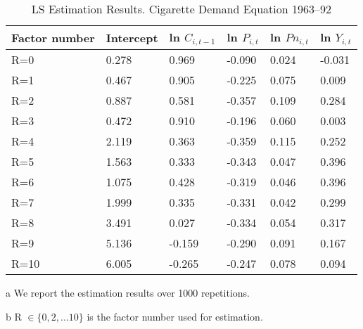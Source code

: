 \documentclass[a4paper]{article}
\begin{document}
\clearpage

\begin{table}[]
\centering
\caption{ LS Estimation Results. Cigarette Demand Equation 1963–92}
\label{table:table10}
\begin{threeparttable}
\begin{tabular}{llllll}
\hline
Factor number & Intercept & ln $C_{i,t-1}$ & ln $P_{i,t}$ & ln $Pn_{i,t}$ & ln $Y_{i,t}$ \\ \hline
R=0           & 0.278     & 0.969          & -0.090       & 0.024         & -0.031       \\
R=1           & 0.467     & 0.905          & -0.225       & 0.075         & 0.009        \\
R=2           & 0.887     & 0.581          & -0.357       & 0.109         & 0.284        \\
R=3           & 0.472     & 0.910          & -0.196       & 0.060         & 0.003        \\
R=4           & 2.119     & 0.363          & -0.359       & 0.115         & 0.252        \\
R=5           & 1.563     & 0.333          & -0.343       & 0.047         & 0.396        \\
R=6           & 1.075     & 0.428          & -0.319       & 0.046         & 0.396        \\
R=7           & 1.999     & 0.335          & -0.331       & 0.042         & 0.299        \\
R=8           & 3.491     & 0.027          & -0.334       & 0.054         & 0.317        \\
R=9           & 5.136     & -0.159         & -0.290       & 0.091         & 0.167        \\
R=10          & 6.005     & -0.265         & -0.247       & 0.078         & 0.094        \\ \hline
\end{tabular}

        \begin{tablenotes}
        \footnotesize
        \item[a] We report the estimation results over 1000 repetitions.
        \item[b] R $\in \{0,2,...10\}$ is the factor number used for estimation.
      \end{tablenotes}
      \end{threeparttable}

\end{table}
\end{document}
